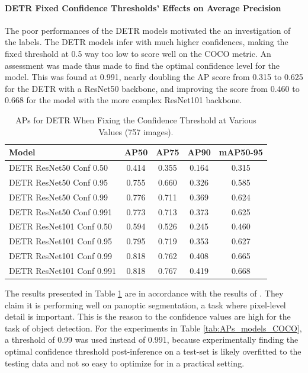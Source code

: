 \paragraph{DETR Fixed Confidence Thresholds' Effects on Average Precision}
The poor performances of the DETR models motivated the an investigation of the labels. The DETR models infer with much higher confidences, making the fixed threshold at 0.5 way too low to score well on the COCO metric. An assessment was made thus made to find the optimal confidence level for the model. This was found at 0.991, nearly doubling the AP score from 0.315 to 0.625 for the DETR with a ResNet50 backbone, and improving the score from 0.460 to 0.668 for the model with the more complex ResNet101 backbone.

\begin{table}[H]
    \centering
    \renewcommand{\arraystretch}{1.5}
    \setlength{\tabcolsep}{1em}
    \begin{tabular}{|l|c|c|c|c|}
        \hline
        \rowcolor{gray!25}
        \textbf{Model} & \textbf{AP50} & \textbf{AP75} & \textbf{AP90} & \textbf{mAP50-95} \\ \hline
        DETR ResNet50 Conf  0.50             & 0.414 & 0.355 & 0.164 & 0.315 \\ \hline
        DETR ResNet50 Conf  0.95             & 0.755 & 0.660 & 0.326 & 0.585 \\ \hline
        DETR ResNet50 Conf  0.99             & 0.776 & 0.711 & 0.369 & 0.624 \\ \hline
        DETR ResNet50 Conf  0.991            & 0.773 & 0.713 & 0.373 & 0.625 \\ \hline
        DETR ResNet101 Conf 0.50             & 0.594 & 0.526 & 0.245 & 0.460 \\ \hline
        DETR ResNet101 Conf 0.95             & 0.795 & 0.719 & 0.353 & 0.627 \\ \hline
        DETR ResNet101 Conf 0.99             & 0.818 & 0.762 & 0.408 & 0.665 \\ \hline
        DETR ResNet101 Conf 0.991            & 0.818 & 0.767 & 0.419 & 0.668 \\ \hline
    \end{tabular}
    \caption{APs for DETR When Fixing the Confidence Threshold at Various Values (757 images).}
    \label{tab:DETR_conf}
\end{table}

The results presented in Table \ref{tab:DETR_conf} are in accordance with the results of \citeauthor{carion2020endtoend}. They claim it is performing well on panoptic segmentation, a task where pixel-level detail is important. This is the reason to the confidence values are high for the task of object detection. For the experiments in Table \ref{tab:APs_models_COCO}, a threshold of 0.99 was used instead of 0.991, because experimentally finding the optimal confidence threshold post-inference on a test-set is likely overfitted to the testing data and not so easy to optimize for in a practical setting.

